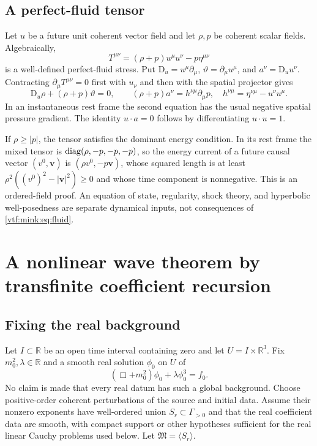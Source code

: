 \documentclass[11pt,letterpaper]{article}
\theoremstyle{definition}
\theoremstyle{remark}
\newcommand{\R}{\mathbb R}\newcommand{\C}{\mathbb C}
\begin{document}
\subsection{A perfect-fluid tensor}
Let $u$ be a future unit coherent vector field and let $\rho,p$ be coherent scalar fields. Algebraically,
\begin{equation}\label{vtf:mink:eq:fluid}
 T^{\mu\nu}=(\rho+p)u^\mu u^\nu-p\eta^{\mu\nu}
\end{equation}
is a well-defined perfect-fluid stress. Put $\mathrm D_u=u^\mu\partial_\mu$, $\vartheta=\partial_\mu u^\mu$, and
$a^\nu=\mathrm D_uu^\nu$. Contracting $\partial_\mu T^{\mu\nu}=0$ first with $u_\nu$ and then with the spatial projector gives
\begin{equation}
 \mathrm D_u\rho+(\rho+p)\vartheta=0,
 \qquad (\rho+p)a^\nu=h^{\nu\mu}\partial_\mu p,
 \quad h^{\nu\mu}=\eta^{\nu\mu}-u^\nu u^\mu.
\end{equation}
In an instantaneous rest frame the second equation has the usual negative spatial pressure gradient. The identity $u\cdot a=0$ follows by differentiating $u\cdot u=1$.

If $\rho\geq|p|$, the tensor satisfies the dominant energy condition. In its rest frame the mixed tensor is $\operatorname{diag}(\rho,-p,-p,-p)$, so the energy current of a future causal vector $(v^0,\mathbf v)$ is $(\rho v^0,-p\mathbf v)$, whose squared length is at least $\rho^2((v^0)^2-|\mathbf v|^2)\geq0$ and whose time component is nonnegative. This is an ordered-field proof. An equation of state, regularity, shock theory, and hyperbolic well-posedness are separate dynamical inputs, not consequences of \cref{vtf:mink:eq:fluid}.

\section{A nonlinear wave theorem by transfinite coefficient recursion}\label{vtf:mink:sec:nonlinear}

\subsection{Fixing the real background}
Let $I\subset\R$ be an open time interval containing zero and let $U=I\times\R^3$. Fix $m_0^2,\lambda\in\R$ and a smooth real solution $\phi_0$ on $U$ of
\begin{equation}
 (\Box+m_0^2)\phi_0+\lambda\phi_0^3=f_0.
\end{equation}
No claim is made that every real datum has such a global background. Choose positive-order coherent perturbations of the source and initial data. Assume their nonzero exponents have well-ordered union $S_r\subset\Gamma_{>0}$ and that the real coefficient data are smooth, with compact support or other hypotheses sufficient for the real linear Cauchy problems used below. Let $\mathfrak M=\langle S_r\rangle$.
\end{document}
